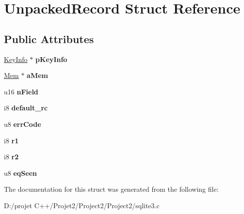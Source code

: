 \hypertarget{struct_unpacked_record}{}\section{Unpacked\+Record Struct Reference}
\label{struct_unpacked_record}
\subsection*{Public Attributes}
\begin{DoxyCompactItemize}
\item 
\mbox{\label{struct_unpacked_record_aeb43e7a1e300857cab2cbe98eacd575b}} 
\mbox{\hyperlink{struct_key_info}{Key\+Info}} $\ast$ {\bfseries p\+Key\+Info}
\item 
\mbox{\label{struct_unpacked_record_a3299c322ceb8b758dacc59701021ae9f}} 
\mbox{\hyperlink{structsqlite3__value}{Mem}} $\ast$ {\bfseries a\+Mem}
\item 
\mbox{\label{struct_unpacked_record_a2c5062735cdbc5039679d255cc900668}} 
u16 {\bfseries n\+Field}
\item 
\mbox{\label{struct_unpacked_record_a8f18c6e59de409bf543de0965652faa9}} 
i8 {\bfseries default\+\_\+rc}
\item 
\mbox{\label{struct_unpacked_record_a5c42d9878256f14c87f0e099b31da4bb}} 
u8 {\bfseries err\+Code}
\item 
\mbox{\label{struct_unpacked_record_aff1dc6903bbc46b232d912bd25683b8a}} 
i8 {\bfseries r1}
\item 
\mbox{\label{struct_unpacked_record_a57a0cc8800e409d46c7c804bc68b5b2b}} 
i8 {\bfseries r2}
\item 
\mbox{\label{struct_unpacked_record_a2efeb544b71d5e6c98b39ac845380e4e}} 
u8 {\bfseries eq\+Seen}
\end{DoxyCompactItemize}


The documentation for this struct was generated from the following file\+:\begin{DoxyCompactItemize}
\item 
D\+:/projet C++/\+Projet2/\+Project2/\+Project2/sqlite3.\+c\end{DoxyCompactItemize}
